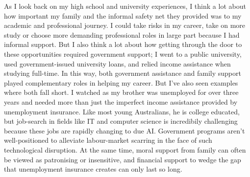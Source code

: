 As I look back on my high school and university experiences, I think a lot about how important my family and the informal safety net they provided was to my academic and professional journey. I could take risks in my career, take on more study or choose more demanding professional roles in large part because I had informal support. But I also think a lot about how getting through the door to these opportunities required government support; I went to a public university, used government-issued university loans, and relied income assistance when studying full-time. In this way, both government assistance and family support played complementary roles in helping my career. But I've also seen examples where both fall short. I watched as my brother was unemployed for over three years and needed more than just the imperfect income assistance provided by unemployment insurance. Like most young Australians, he is college educated, but job-search in fields like IT and computer science is incredibily challenging because these jobs are rapidly changing to due AI. Government programs aren't well-positioned to alleviate labour-market scarring in the face of such technological disruption. At the same time, moral support from family can often be viewed as patronising or insensitive, and financial support to wedge the gap that unemployment insurance creates can only last so long.

